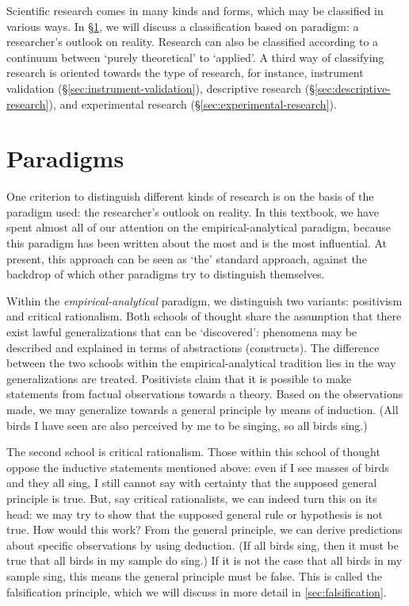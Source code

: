 \documentclass[
]{book}
\begin{document}
Scientific research comes in many kinds and forms, which may be classified in various ways. In §\ref{sec:paradigms}, we will discuss a classification based on paradigm: a researcher's outlook on reality. Research can also be classified according to a continuum between `purely theoretical' to `applied'. A third way of classifying research is oriented towards the type of research, for instance, instrument validation (§\ref{sec:instrument-validation}), descriptive research (§\ref{sec:descriptive-research}), and experimental research (§\ref{sec:experimental-research}).

\hypertarget{sec:paradigms}{%
\section{Paradigms}\label{sec:paradigms}}

One criterion to distinguish different kinds of research is on the basis of the paradigm used: the researcher's outlook on reality. In this textbook, we have spent almost all of our attention on the empirical-analytical paradigm, because this paradigm has been written about the most and is the most influential. At present, this approach can be seen as `the' standard approach, against the backdrop of which other paradigms try to distinguish themselves.

Within the \emph{empirical-analytical} paradigm, we distinguish two variants: positivism and critical rationalism. Both schools of thought share the assumption that there exist lawful generalizations that can be `discovered': phenomena may be described and explained in terms of abstractions (constructs). The difference between the two schools within the empirical-analytical tradition lies in the way generalizations are treated. Positivists claim that it is possible to make statements from factual observations towards a theory. Based on the observations made, we may generalize towards a general principle by means of induction. (All birds I have seen are also perceived by me to be singing, so all birds sing.)

The second school is critical rationalism. Those within this school of thought oppose the inductive statements mentioned above: even if I see masses of birds and they all sing, I still cannot say with certainty that the supposed general principle is true. But, say critical rationalists, we can indeed turn this on its head: we may try to show that the supposed general rule or hypothesis is not true. How would this work? From the general principle, we can derive predictions about specific observations by using deduction. (If all birds sing, then it must be true that all birds in my sample do sing.) If it is not the case that all birds in my sample sing, this means the general principle must be false. This is called the falsification principle, which we will discuss in more detail in \ref{sec:falsification}.
\end{document}
